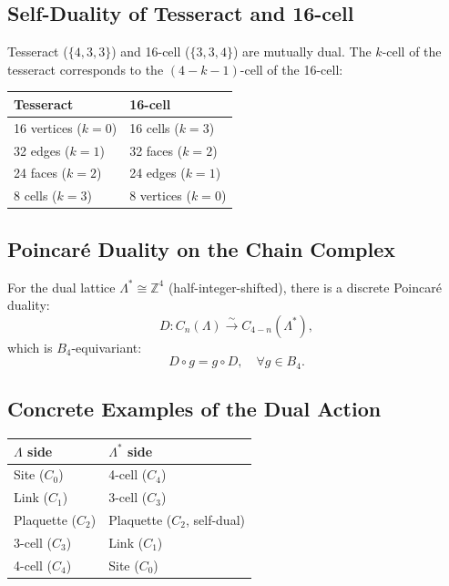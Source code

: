 \documentclass[a4paper,11pt]{article}
\begin{document}
\subsection{Self-Duality of Tesseract and 16-cell}

Tesseract ($\{4,3,3\}$) and 16-cell ($\{3,3,4\}$) are mutually dual. The $k$-cell of the tesseract corresponds to the $(4-k-1)$-cell of the 16-cell:

\begin{center}
\begin{tabular}{ll}
\toprule
Tesseract & 16-cell \\
\midrule
16 vertices ($k=0$) & 16 cells ($k=3$) \\
32 edges ($k=1$) & 32 faces ($k=2$) \\
24 faces ($k=2$) & 24 edges ($k=1$) \\
8 cells ($k=3$) & 8 vertices ($k=0$) \\
\bottomrule
\end{tabular}
\end{center}

\subsection{Poincar\'e Duality on the Chain Complex}

For the dual lattice $\Lambda^* \cong \mathbb{Z}^4$ (half-integer-shifted), there is a discrete Poincar\'e duality:
\begin{equation}
D : C_n(\Lambda) \xrightarrow{\sim} C_{4-n}(\Lambda^*), \tag{3.1}
\end{equation}
which is $B_4$-equivariant:
\begin{equation}
D \circ g = g \circ D, \quad \forall g \in B_4. \tag{3.2}
\end{equation}

\subsection{Concrete Examples of the Dual Action}

\begin{center}
\begin{tabular}{ll}
\toprule
$\Lambda$ side & $\Lambda^*$ side \\
\midrule
Site ($C_0$) & 4-cell ($C_4$) \\
Link ($C_1$) & 3-cell ($C_3$) \\
Plaquette ($C_2$) & Plaquette ($C_2$, self-dual) \\
3-cell ($C_3$) & Link ($C_1$) \\
4-cell ($C_4$) & Site ($C_0$) \\
\bottomrule
\end{tabular}
\end{center}
\end{document}
